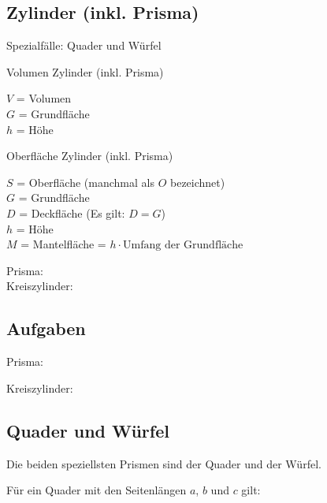 \newpage
\subsection{Zylinder (inkl. Prisma)}
Spezialfälle: Quader und Würfel

\begin{gesetz}{Volumen Zylinder (inkl. Prisma)}{}

  $V$ = Volumen\\
  $G$ = Grundfläche\\
  $h$ = Höhe\\
  \begin{center}\end{center}
\end{gesetz}

\begin{gesetz}{Oberfläche Zylinder (inkl. Prisma)}{}

  $S$ = Oberfläche (manchmal als $O$ bezeichnet)\\
  $G$ = Grundfläche\\
  $D$ = Deckfläche (Es gilt: $D=G$)\\
  $h$ = Höhe\\
  $M$ = Mantelfläche = $h \cdot{} \textrm{Umfang der Grundfläche}$\\
  \begin{center}\end{center}
\end{gesetz}

Prisma: \\
Kreiszylinder: 

\subsection*{Aufgaben}
Prisma:


Kreiszylinder:
\newpage
\subsection{Quader und Würfel}
Die beiden speziellsten Prismen sind der Quader und der Würfel.

Für ein Quader mit den Seitenlängen $a$, $b$ und $c$ gilt:

